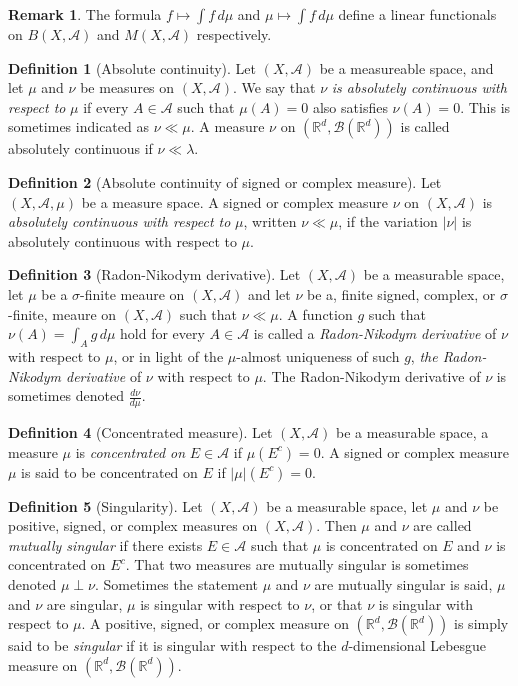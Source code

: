 \documentclass[12pt]{article}
\theoremstyle{definition}
\newtheorem{definition}{Definition}[section]
\newtheorem*{remark}{Remark}
\newcommand{\real}{\mathbb{R}}   %
\newcommand{\algebra}{\mathscr{A}}
\begin{document}
\begin{remark}
    The formula $f\mapsto \int f\,d\mu$ and $\mu\mapsto \int f\,d\mu$ define a linear functionals on $B(X,\algebra)$ and $M(X,\algebra)$ respectively.
\end{remark}
\begin{definition}[Absolute continuity]
    Let $(X,\algebra)$ be a measureable space, and let $\mu$ and $\nu$ be measures on $(X,\algebra)$. We say that $\nu$ \textit{is absolutely continuous with respect to} $\mu$ if every $A\in \algebra$ such that $\mu(A)=0$ also satisfies $\nu(A)=0$. This is sometimes indicated as $\nu\ll\mu$. A measure $\nu$ on $(\real^d,\mathscr{B}(\real^d))$ is called absolutely continuous if $\nu\ll\lambda$.
\end{definition}
\begin{definition}[Absolute continuity of signed or complex measure]
    Let $(X,\algebra,\mu)$ be a measure space. A signed or complex measure $\nu$ on $(X,\algebra)$ is \textit{absolutely continuous with respect to} $\mu$, written $\nu\ll\mu$, if the variation $|\nu|$ is absolutely continuous with respect to $\mu$.
\end{definition}
\begin{definition}[Radon-Nikodym derivative]
    Let $(X,\algebra)$ be a measurable space, let $\mu$ be a $\sigma$-finite meaure on $(X,\algebra)$ and let $\nu$ be a, finite signed, complex, or $\sigma$-finite, meaure on $(X,\algebra)$ such that $\nu\ll\mu$. A function $g$ such that $\nu(A)=\int_Ag\,d\mu$ hold for every $A\in\algebra$ is called a \textit{Radon-Nikodym derivative} of $\nu$ with respect to $\mu$, or in light of the $\mu$-almost uniqueness of such $g$, \textit{the Radon-Nikodym derivative} of $\nu$ with respect to $\mu$. The Radon-Nikodym derivative of $\nu$ is sometimes denoted $\frac{d\nu}{d\mu}$.
\end{definition}
\begin{definition}[Concentrated measure]
    Let $(X,\algebra)$ be a measurable space, a measure $\mu$ is \textit{concentrated on} $E\in\algebra$ if $\mu(E^c)=0$. A signed or complex measure $\mu$ is said to be concentrated on $E$ if $|\mu|(E^c)=0$.
\end{definition}
\begin{definition}[Singularity]
    Let $(X,\algebra)$ be a measurable space, let $\mu$ and $\nu$ be positive, signed, or complex measures on $(X,\algebra)$. Then $\mu$ and $\nu$ are called \textit{mutually singular} if there exists $E\in\algebra$ such that $\mu$ is concentrated on $E$ and $\nu$ is concentrated on $E^c$. That two measures are mutually singular is sometimes denoted $\mu\perp\nu$. Sometimes the statement $\mu$ and $\nu$ are mutually singular is said, $\mu$ and $\nu$ are singular, $\mu$ is singular with respect to $\nu$, or that $\nu$ is singular with respect to $\mu$. A positive, signed, or complex measure on $(\real^d,\mathscr{B}(\real^d))$ is simply said to be \textit{singular} if it is singular with respect to the $d$-dimensional Lebesgue measure on $(\real^d,\mathscr{B}(\real^d))$.
\end{definition}
\end{document}
